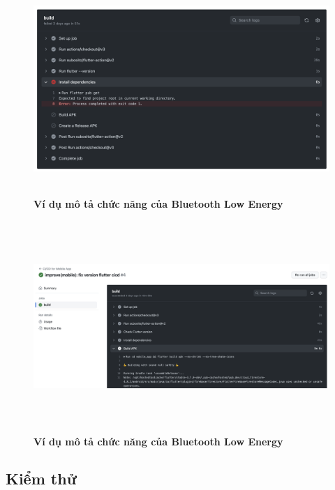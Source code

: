 \begin{figure}[H]
  \centering
  \includegraphics[width=16cm,height=8cm]{Images/mobile_app/demo/error_detail_ci_cd.png}
  \caption[Ví dụ mô tả chức năng của Bluetooth Low Energy]{\bfseries \fontsize{12pt}{0pt}
  \selectfont Ví dụ mô tả chức năng của Bluetooth Low Energy}
  \label{demo} %
\end{figure}

\begin{figure}[H]
  \centering
  \includegraphics[width=16cm,height=8cm]{Images/mobile_app/demo/success_case_ci_cd.png}
  \caption[Ví dụ mô tả chức năng của Bluetooth Low Energy]{\bfseries \fontsize{12pt}{0pt}
  \selectfont Ví dụ mô tả chức năng của Bluetooth Low Energy}
  \label{demo} %
\end{figure}

\subsection{Kiểm thử}

